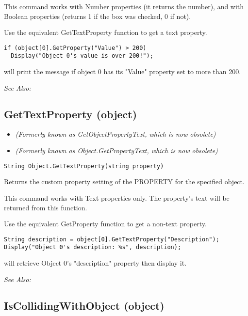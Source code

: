 This command works with Number properties (it returns the number), and with Boolean
properties (returns 1 if the box was checked, 0 if not).

Use the equivalent GetTextProperty function to get a text property.

\begin{verbatim}
if (object[0].GetProperty("Value") > 200)
  Display("Object 0's value is over 200!");
\end{verbatim}
will print the message if object 0 has its "Value" property set to more than 200.

\it{See Also:} 


\subsection{GetTextProperty (object)}\label{Object.GetTextProperty}%

\begin{itemize}
\item \it{(Formerly known as GetObjectPropertyText, which is now obsolete)}
\item \it{(Formerly known as Object.GetPropertyText, which is now obsolete)}
\end{itemize}

\begin{verbatim}
String Object.GetTextProperty(string property)
\end{verbatim}
Returns the custom property setting of the PROPERTY for the specified object.

This command works with Text properties only. The property's text will be
returned from this function.

Use the equivalent GetProperty function to get a non-text property.

\begin{verbatim}
String description = object[0].GetTextProperty("Description");
Display("Object 0's description: %s", description);
\end{verbatim}
will retrieve Object 0's "description" property then display it.

\it{See Also:} 


\subsection{IsCollidingWithObject (object)}\label{Object.IsCollidingWithObject}%

